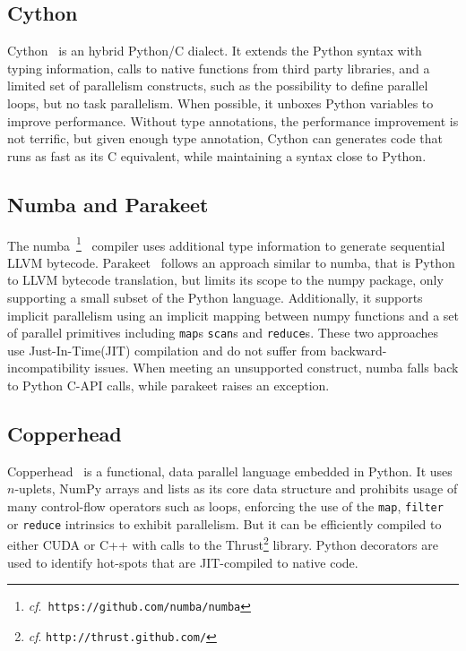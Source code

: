 \documentclass[10pt, preprint]{sigplanconf}
\begin{document}

\subsection{Cython}
\cite{cython2010}

% 
Cython~\cite{cython2010} is an hybrid Python/C dialect. It extends the Python
syntax with typing information, calls to native functions from third party
libraries, and a limited set of parallelism constructs, such as the possibility
to define parallel loops, but no task parallelism. When possible, it unboxes
Python variables to improve performance. Without type annotations, the
performance improvement is not terrific, but given enough type annotation,
Cython can generates code that runs as fast as its C equivalent, while
maintaining a syntax close to Python.


\subsection{Numba and Parakeet}


The numba~\footnote{\emph{cf}.\ \texttt{https://github.com/numba/numba}}~\cite{numba}
compiler uses additional type information to generate sequential LLVM bytecode.
Parakeet~\cite{parakeet2012} follows an approach similar to numba, that is
Python to LLVM bytecode translation, but limits its scope to the numpy package,
only supporting a small subset of the Python language. Additionally, it supports
implicit parallelism using an implicit mapping between numpy functions and a set
of parallel primitives including \texttt{map}s \texttt{scan}s and
\texttt{reduce}s. These two approaches use Just-In-Time(JIT) compilation and do
not suffer from backward-incompatibility issues. When meeting an unsupported
construct, numba falls back to Python C-API calls, while parakeet raises an
exception.



\subsection{Copperhead}
\cite{copperhead2011}

Copperhead~\cite{copperhead2011} is a functional, data parallel language
embedded in Python. It uses $n$-uplets, NumPy arrays and lists as its core data
structure and prohibits usage of many control-flow operators such as loops,
enforcing the use of the \texttt{map}, \texttt{filter} or \texttt{reduce}
intrinsics to exhibit parallelism. But it can be efficiently compiled to either
CUDA or C++ with calls to the Thrust\footnote{\emph{cf}.
\texttt{http://thrust.github.com/}} library. Python decorators are used to
identify hot-spots that are JIT-compiled to native code.
\end{document}
